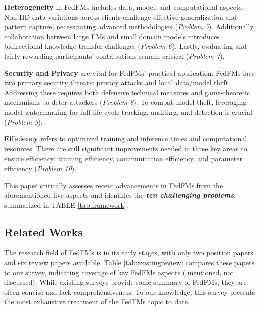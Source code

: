 \textbf{Heterogeneity} in FedFMs includes data, model, and computational aspects. Non-IID data variations across clients challenge effective generalization and pattern capture, necessitating advanced methodologies \cite{park2024fedbaffederatedlearningaggregation} (\textit{Problem 5}). Additionally, collaboration between large FMs and small domain models introduces bidirectional knowledge transfer challenges \cite{fan-etal-2025-fedmkt} (\textit{Problem 6}). Lastly, evaluating and fairly rewarding participants' contributions remain critical \cite{wei2020efficient} (\textit{Problem 7}).

\textbf{Security and Privacy} are vital for FedFMs' practical application. FedFMs face two primary security threats: privacy attacks and local data/model theft. Addressing these requires both defensive technical measures and game-theoretic mechanisms to deter attackers \cite{zhang2024game} (\textit{Problem 8}). To combat model theft, leveraging model watermarking for full life-cycle tracking, auditing, and detection is crucial  \cite{li2022fedipr} (\textit{Problem 9}).

\textbf{Efficiency} refers to optimized training and inference times and computational resources. There are still significant improvements needed in three key areas to ensure efficiency: training efficiency, communication efficiency, and parameter efficiency 
 \cite{mcmahan2017communication,wang2021resource, hu2021mhat} (\textit{Problem 10}).

This paper critically assesses recent advancements in FedFMs from the aforementioned five aspects and identifies the \textbf{\textit{ten challenging problems}}, summarized in TABLE \ref{tab:framework}.


\subsection{Related Works}

The research field of FedFMs is in its early stages, with only two position papers \cite{chen2023federated,li2024position} and six review papers \cite{zhuang2023foundation,yu2023federated,kang2023grounding,woisetschlager2024survey,li2024synergizing,ren2024advances} available. Table \ref{tab:existingreview} compares these papers to our survey, indicating coverage of key FedFMs aspects ( mentioned,  not discussed). While existing surveys provide some summary of FedFMs, they are often concise and lack comprehensiveness. To our knowledge, this survey presents the most exhaustive treatment of the FedFMs topic to date.

